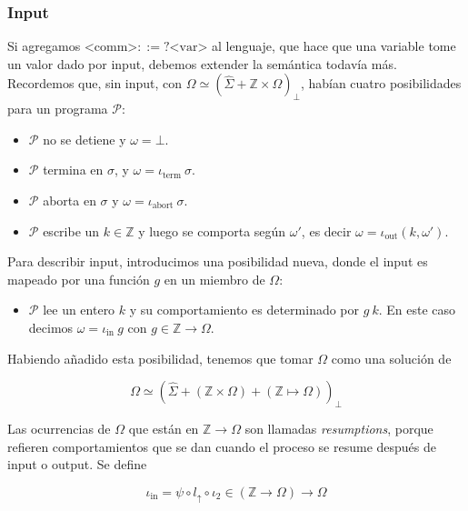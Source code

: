\documentclass[a4paper, 12pt]{article}
\begin{document}
\subsubsection{Input}

Si agregamos $\text{<comm>} ::= ?\text{<var>}$ al lenguaje, que hace que una
variable tome un valor dado por input, debemos extender la semántica todavía
más. Recordemos que, sin input, con $\Omega \simeq (\hat{\Sigma} + \mathbb{Z}
\times \Omega)_\bot $, habían cuatro posibilidades para un programa
$\mathcal{P}$:

\begin{itemize}
  \item $\mathcal{P}$ no se detiene y $\omega = \bot $.
  \item $\mathcal{P}$ termina en $\sigma$, y $\omega = \iota_{\text{term}} ~
    \sigma$. 
  \item $\mathcal{P}$ aborta en $\sigma$ y $\omega = \iota_{\text{abort}} ~
    \sigma$. 
  \item $\mathcal{P}$ escribe un $k \in \mathbb{Z}$ y luego se comporta según
    $\omega'$, es decir $\omega = \iota_{\text{out}}(k, \omega')$.
\end{itemize}

Para describir input, introducimos una posibilidad nueva, donde el input es
mapeado por una función $g$ en un miembro de $\Omega$:

\begin{itemize}
  \item $\mathcal{P}$ lee un entero $k$ y su comportamiento es determinado por
    $g ~ k$. En este caso decimos $\omega = \iota_{\text{in}} ~ g$ con $g \in
    \mathbb{Z} \to \Omega$.
\end{itemize}

Habiendo añadido esta posibilidad, tenemos que tomar $\Omega$ como una solución
de 

\begin{equation*}
  \Omega \simeq \left( \hat{\Sigma} + \left( \mathbb{Z} \times \Omega \right) +
  \left( \mathbb{Z} \mapsto \Omega \right) \right)_\bot 
\end{equation*}

Las ocurrencias de $\Omega$ que están en $\mathbb{Z} \to \Omega$ son llamadas
\textit{resumptions}, porque refieren comportamientos que se dan cuando el
proceso se resume después de input o output. Se define 

\begin{equation*}
  \iota_{\text{in}} = \psi \circ l_{\uparrow} \circ \iota_2 \in \left(
  \mathbb{Z} \to \Omega \right) \to \Omega
\end{equation*}
\end{document}

